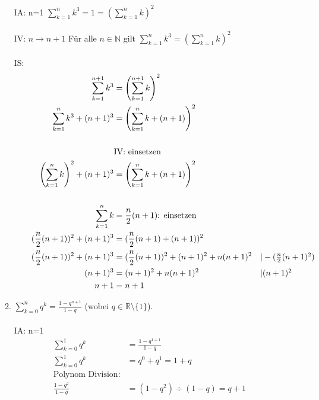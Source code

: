 \documentclass[12pt,letterpaper]{article}
\newcommand{\alignleft}[1]{\tag*{\llap{\makebox[\linewidth][l]{$#1$}}}}
\newcommand{\LLeftrightarrow}{ \alignleft{\Leftrightarrow}}
\newcommand{\eqinfo}[1]{&\makebox[2cm][l]{$\vert #1$}}
\newcommand{\Eqn}[3]{#1 &#2 #3}
\newcommand{\eqnf}[2]{\Eqn{#1}{=}{#2}\\}
\newcommand{\eqn}[2]{\LLeftrightarrow\Eqn{#1}{=}{#2}\\}
\newcommand{\eqni}[3]{\LLeftrightarrow\Eqn{#1}{=}{#2}\eqinfo{#3}\\}
\begin{document}
\begin{enumerate}
\begin{enumerate}
IA: n=1 $\sum\limits_{k=1}^{n}k^3=1=\left(\sum\limits_{k=1}^{n}k\right)^2$\\
\\
IV: $n\to n+1$ Für alle $n\in \mathbb{N}$ gilt $\sum\limits_{k=1}^{n}k^3 = \left(\sum\limits_{k=1}^{n}k\right)^2$\\
\\
IS: 
\begin{align*}
	\eqnf{\sum_{k=1}^{n+1}k^3}{\left(\sum_{k=1}^{n+1}k\right)^2}
	\eqn{\sum_{k=1}^{n}k^3+(n+1)^3}{\left(\sum_{k=1}^{n}k+(n+1)\right)^2}\\
	&\text{IV: einsetzen}\\
	\eqn{\left(\sum_{k=1}^{n}k\right)^2+(n+1)^3}{\left(\sum_{k=1}^{n}k+(n+1)\right)^2}\\
	\sum_{k=1}^{n}k&=\frac{n}{2}(n+1)\text{: einsetzen}\\ 
	\eqn{(\frac{n}{2}(n+1))^2+(n+1)^3}{(\frac{n}{2}(n+1)+(n+1))^2}
	\eqni{(\frac{n}{2}(n+1))^2+(n+1)^3}{(\frac{n}{2}(n+1))^2+(n+1)^2+n(n+1)^2}{-(\frac{n}{2}(n+1)^2)}
	\eqni{(n+1)^3}{(n+1)^2+n(n+1)^2}{(n+1)^2}
	\eqn{n+1}{n+1}
\end{align*}

\item $\sum\limits_{k=0}^{n}q^k = \frac{1-q^{n+1}}{1-q}$ (wobei $q\in\mathbb{R}\setminus\{1\}$).\\ \\
IA: n=1
\begin{align*}
	\sum_{k=0}^{1}q^k &= \frac{1-q^{1+1}}{1-q}\\
	\sum_{k=0}^{1}q^k&=q^0+q^1=1+q\\
	\text{Polynom Division:}\\
	\frac{1-q^2}{1-q} &= (1-q^2)\div (1-q) = q+1
\end{align*}\\


\end{enumerate}
\end{enumerate}
\end{document}
